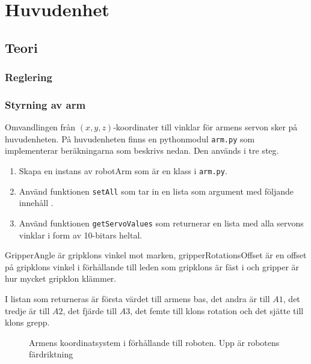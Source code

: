 
\section{Huvudenhet}

\subsection{Teori}

\subsubsection{Reglering}

\subsubsection{Styrning av arm}
Omvandlingen från $(x,y,z)$-koordinater till vinklar för armens servon sker på huvudenheten. På huvudenheten finns en pythonmodul \texttt{arm.py} som implementerar beräkningarna som beskrivs nedan. Den används i tre steg.
\begin{enumerate}
    \item Skapa en instans av robotArm som är en klass i \texttt{arm.py}.
    \item Använd funktionen \texttt{setAll} som tar in en lista som argument med följande innehåll .
    \item Använd funktionen \texttt{getServoValues} som returnerar en lista med alla servons vinklar i form av 10-bitars heltal.
\end{enumerate}

GripperAngle är gripklons vinkel mot marken, gripperRotationsOffset är en offset på gripklons vinkel i förhållande till leden som gripklons är fäst i och gripper är hur mycket gripklon klämmer.

I listan som returneras är första värdet till armens bas, det andra är till $A1$, det tredje är till $A2$, det fjärde till $A3$, det femte till klons rotation och det sjätte till klons grepp.

\begin{figure}[h!]
    \centerline{}
    \caption{Armens koordinatsystem i förhållande till roboten. Upp är robotens färdriktning}
\end{figure}


